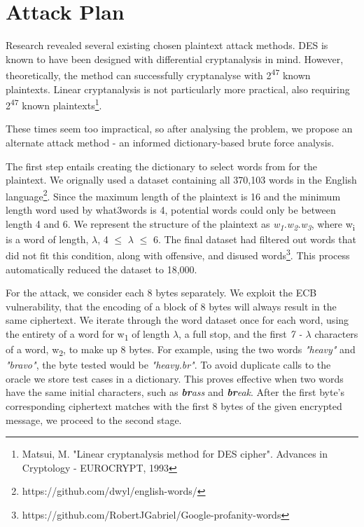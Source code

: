 \documentclass{article}[]
\begin{document}
	\section{Attack Plan}
	Research revealed several existing chosen plaintext attack methods. DES is known to have been designed with differential cryptanalysis in mind. However, theoretically, the method can successfully cryptanalyse with 2\textsuperscript{47} known plaintexts. Linear cryptanalysis is not particularly more practical, also requiring 2\textsuperscript{47} known plaintexts\footnote{Matsui, M. "Linear cryptanalysis method for DES cipher". Advances in Cryptology - EUROCRYPT, 1993}.
	
	These times seem too impractical, so after analysing the problem, we propose an alternate attack method - an informed dictionary-based brute force analysis.
	
	The first step entails creating the dictionary to select words from for the plaintext. We orignally used a dataset containing all 370,103 words in the English language\footnote{https://github.com/dwyl/english-words/}. Since the maximum length of the plaintext is 16 and the minimum length word used by what3words is 4\footnotemark[\ref{note1}], potential words could only be between length 4 and 6. We represent the structure of the plaintext as \textit{w\textsubscript{1}.w\textsubscript{2}.w\textsubscript{3}}, where w\textsubscript{i} is a word of length, $\lambda$, 4 $\leq$ $\lambda$ $\leq$ 6. The final dataset had filtered out words that did not fit this condition, along with offensive, and disused words\footnote{https://github.com/RobertJGabriel/Google-profanity-words}. This process automatically reduced the dataset to 18,000.
	
	For the attack, we consider each 8 bytes separately. We exploit the ECB vulnerability, that the encoding of a block of 8 bytes will always result in the same ciphertext. We iterate through the word dataset once for each word, using the entirety of a word for w\textsubscript{1} of length \textit{$\lambda$}, a full stop, and the first \textit{7 - $\lambda$} characters of a word, w\textsubscript{2}, to make up 8 bytes. For example, using the two words \textit{"heavy"} and \textit{"bravo"}, the byte tested would be \textit{"heavy.br"}. To avoid duplicate calls to the oracle we store test cases in a dictionary. This proves effective when two words have the same initial characters, such as \textit{\textbf{br}ass} and \textit{\textbf{br}eak}. After the first byte's corresponding ciphertext matches with the first 8 bytes of the given encrypted message, we proceed to the second stage. 
	
\end{document}
